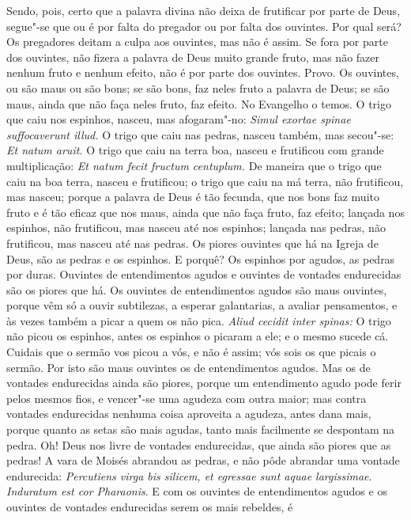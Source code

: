 Sendo, pois, certo que a palavra divina não deixa de frutificar
por parte de Deus, segue"-se que ou é por falta do pregador ou por
falta dos ouvintes. Por qual será? Os pregadores deitam a culpa aos
ouvintes, mas não é assim. Se fora por parte dos ouvintes, não fizera a
palavra de Deus muito grande fruto, mas não fazer nenhum fruto e
nenhum efeito, não é por parte dos ouvintes. Provo. Os ouvintes, ou são
maus ou são bons; se são bons, faz neles fruto a palavra de Deus; se são maus, ainda que não faça neles
fruto, faz efeito. No Evangelho o temos. O trigo que caiu nos espinhos,
nasceu, mas afogaram"-no: \emph{Simul exortae spinae suffocaverunt
illud.} O trigo que caiu nas pedras, nasceu também, mas secou"-se:
\emph{Et natum aruit.} O trigo que caiu na terra boa, nasceu e
frutificou com grande multiplicação: \emph{Et natum fecit fructum centuplum.} De maneira que o trigo que caiu na boa terra, nasceu e
frutificou; o trigo que caiu na má terra, não frutificou, mas nasceu;
porque a palavra de Deus é tão fecunda, que nos bons faz muito fruto e é
tão eficaz que nos maus, ainda que não faça fruto, faz efeito; lançada
nos espinhos, não frutificou, mas nasceu até nos espinhos; lançada nas
pedras, não frutificou, mas nasceu até nas pedras. Os piores ouvintes
que há na Igreja de Deus, são as pedras e os espinhos. E porquê? Os
espinhos por agudos, as pedras por duras. Ouvintes de entendimentos
agudos e ouvintes de vontades endurecidas são os piores que há. Os
ouvintes de entendimentos agudos são maus ouvintes, porque vêm só a
ouvir subtilezas, a esperar galantarias, a avaliar pensamentos, e às
vezes também a picar a quem os não pica. \emph{Aliud cecidit inter
spinas:} O trigo não picou os espinhos, antes os espinhos o picaram a
ele; e o mesmo sucede cá. Cuidais que o sermão vos picou a vós, e não é
assim; vós sois os que picais o sermão. Por isto são maus ouvintes os de
entendimentos agudos. Mas os de vontades endurecidas ainda são piores,
porque um entendimento agudo pode ferir pelos mesmos fios, e vencer"-se
uma agudeza com outra maior; mas contra vontades endurecidas nenhuma
coisa aproveita a agudeza, antes dana mais, porque quanto as setas são
mais agudas, tanto mais facilmente se despontam na pedra. Oh! Deus nos
livre de vontades endurecidas, que ainda são piores que as pedras! A
vara de Moisés abrandou as pedras, e não pôde abrandar uma vontade
endurecida:
\emph{Percutiens virga bis silicem, et egressae sunt aquae
largissimae}. \emph{Induratum est cor
Pharaonis}. E com os ouvintes de entendimentos
agudos e os ouvintes de vontades endurecidas serem os mais rebeldes, é
